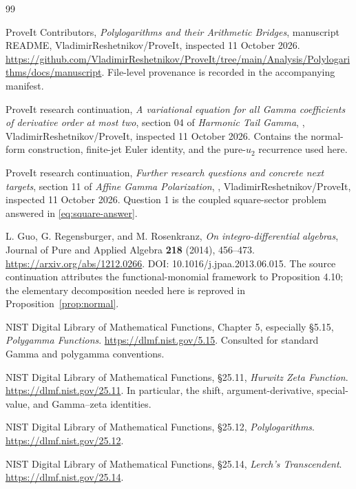 \documentclass[11pt]{article}
\numberwithin{equation}{section}
\theoremstyle{definition}\newtheorem{definition}[theorem]{Definition}
\theoremstyle{remark}\newtheorem{remark}[theorem]{Remark}
\begin{document}
\clearpage
\begingroup
\small\raggedright
\begin{thebibliography}{99}

ProveIt Contributors,
\emph{Polylogarithms and their Arithmetic Bridges}, manuscript README,
VladimirReshetnikov/ProveIt, inspected 11 October 2026.
\url{https://github.com/VladimirReshetnikov/ProveIt/tree/main/Analysis/Polylogarithms/docs/manuscript}.
File-level provenance is recorded in the accompanying manifest.

ProveIt research continuation,
\emph{A variational equation for all Gamma coefficients of derivative
order at most two}, section 04 of \emph{Harmonic Tail Gamma},
,
VladimirReshetnikov/ProveIt, inspected 11 October 2026.
Contains the normal-form construction, finite-jet Euler identity, and the
pure-$u_2$ recurrence used here.

ProveIt research continuation,
\emph{Further research questions and concrete next targets}, section 11
of \emph{Affine Gamma Polarization},
,
VladimirReshetnikov/ProveIt, inspected 11 October 2026.
Question 1 is the coupled square-sector problem answered in
\eqref{eq:square-answer}.

L. Guo, G. Regensburger, and M. Rosenkranz,
\emph{On integro-differential algebras},
Journal of Pure and Applied Algebra \textbf{218} (2014), 456--473.
\url{https://arxiv.org/abs/1212.0266}.
DOI: 10.1016/j.jpaa.2013.06.015.
The source continuation attributes the functional-monomial framework to
Proposition 4.10; the elementary decomposition needed here is reproved in
Proposition~\ref{prop:normal}.

NIST Digital Library of Mathematical Functions,
Chapter 5, especially \S5.15, \emph{Polygamma Functions}.
\url{https://dlmf.nist.gov/5.15}.
Consulted for standard Gamma and polygamma conventions.

NIST Digital Library of Mathematical Functions,
\S25.11, \emph{Hurwitz Zeta Function}.
\url{https://dlmf.nist.gov/25.11}.
In particular, the shift, argument-derivative, special-value, and
Gamma--zeta identities.

NIST Digital Library of Mathematical Functions,
\S25.12, \emph{Polylogarithms}.
\url{https://dlmf.nist.gov/25.12}.

NIST Digital Library of Mathematical Functions,
\S25.14, \emph{Lerch's Transcendent}.
\url{https://dlmf.nist.gov/25.14}.

\end{thebibliography}

\endgroup

\end{document}

